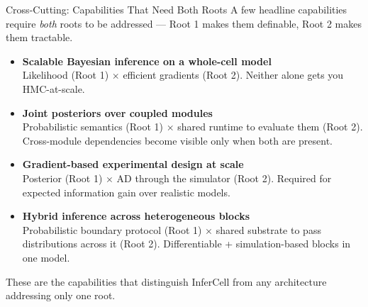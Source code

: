 \documentclass[aspectratio=169]{beamer}
\begin{document}
\begin{frame}[noframenumbering]{Cross-Cutting: Capabilities That Need Both Roots}
	\footnotesize
	A few headline capabilities require \emph{both} roots to be addressed --- Root 1 makes them definable, Root 2 makes them tractable.

	\medskip
	\begin{itemize}\itemsep6pt
		\item \textbf{Scalable Bayesian inference on a whole-cell model}\\
		{\scriptsize Likelihood (Root 1) $\times$ efficient gradients (Root 2). Neither alone gets you HMC-at-scale.}

		\item \textbf{Joint posteriors over coupled modules}\\
		{\scriptsize Probabilistic semantics (Root 1) $\times$ shared runtime to evaluate them (Root 2). Cross-module dependencies become visible only when both are present.}

		\item \textbf{Gradient-based experimental design at scale}\\
		{\scriptsize Posterior (Root 1) $\times$ AD through the simulator (Root 2). Required for expected information gain over realistic models.}

		\item \textbf{Hybrid inference across heterogeneous blocks}\\
		{\scriptsize Probabilistic boundary protocol (Root 1) $\times$ shared substrate to pass distributions across it (Root 2). Differentiable + simulation-based blocks in one model.}
	\end{itemize}

	\medskip
	\centering
	\alert{These are the capabilities that distinguish InferCell from any architecture addressing only one root.}
\end{frame}


\end{document}
